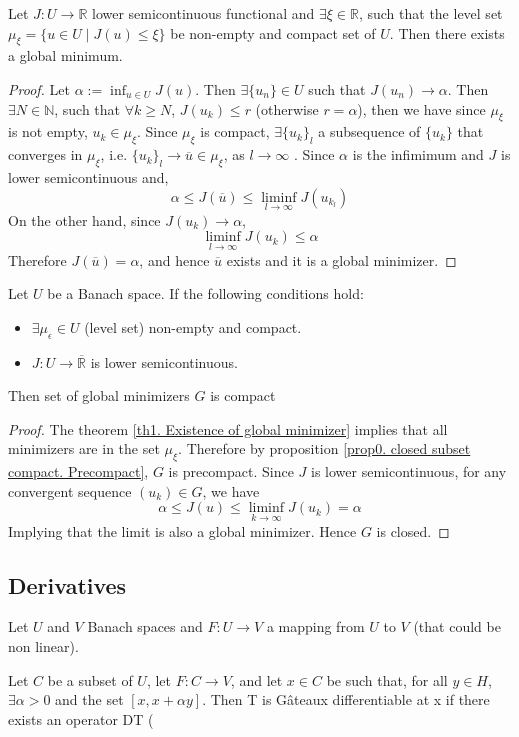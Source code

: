 \begin{theorem}
	Let $J: U\rightarrow \mathbb{R}$ lower semicontinuous functional and $\exists \xi \in \mathbb{R}$, such that the level set $\mu_\xi=\{ u \in U \mid J(u)\leq \xi\}$ be non-empty and compact set of $U$. Then there exists a global minimum.
	\begin{proof}
		Let $\alpha := \inf_{u\in U} J(u)$. Then $\exists \{u_n\} \in U $ such that $J(u_n) \rightarrow \alpha$. Then  $\exists N\in \mathbb{N}$, such that $\forall k \geq N$,  $J(u_k) \leq r$ (otherwise $r=\alpha$), then we have since $\mu_\xi$ is not empty, $u_k \in \mu_\xi$. Since $\mu_\xi$ is compact,  $\exists \{u_k\}_l$ a subsequence of $\{u_k\}$ that converges in $\mu_\xi$, i.e. $\{u_k\}_l \rightarrow \overline{u} \in \mu_\xi$, as $l \rightarrow \infty$	. Since $\alpha$ is the infimimum and $J$ is lower semicontinuous and,
		 \[\alpha \leq J(\overline{u}) \leq \liminf_{l\rightarrow \infty} J(u_{k_l}) \]
		 On the other hand,  since $J(u_k) \rightarrow \alpha$,
		 \[
		  \liminf_{l\rightarrow \infty} J(u_k) \leq \alpha
		 \]
		 Therefore $J(\overline{u})=\alpha$, and hence $\overline{u}$ exists and it is a global minimizer.
	\end{proof}
	\label{th1. Existence of global minimizer}
\end{theorem}
\begin{corollary}
	Let $U$ be a Banach space. If the following conditions hold:
	\begin{itemize}
		\item $\exists \mu_\epsilon \in U$ (level set) non-empty and compact.
		\item $J: U \rightarrow \overline{\mathbb{R}}$ is lower semicontinuous. 
	\end{itemize}
	Then set of global minimizers  $G$ is compact
	\begin{proof}
		The theorem \ref{th1. Existence of global minimizer} implies that all minimizers are in the set $\mu_\xi$. Therefore by proposition \ref{prop0. closed subset compact. Precompact}, $G$ is precompact. Since $J$ is lower semicontinuous, for any convergent sequence $(u_k) \in G$, we have
		\[
			\alpha \leq J(u) \leq \liminf_{k\rightarrow\infty} J(u_k)=\alpha
		\]
		Implying that the limit is also a global minimizer. Hence $G$ is closed.
	\end{proof}
\end{corollary}
\subsection{Derivatives}
Let $U$ and $V$ Banach spaces and $F:U\rightarrow V$ a mapping from $U$ to $V$ (that could be non linear).
\begin{definition}
	Let $C$ be a subset of $U$, let $F: C \rightarrow V$, and let $x \in C$
	be such that, for all $y \in H$, $\exists \alpha >0$ and the set $[x, x + \alpha y]$. Then T is Gâteaux
	differentiable at x if there exists an operator DT (
\end{definition}
 
